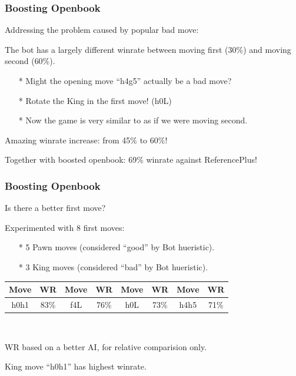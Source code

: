 \documentclass[10pt]{beamer}
\begin{document}
	\begin{frame}
		\frametitle{Boosting Openbook}

		Addressing the problem caused by popular bad move:

		The bot has a largely different winrate between moving first (\textcolor{dred}{30\%}) and moving second (\textcolor{fgreen}{60\%}).

		\begin{itemize}
		\item[*] Might the opening move ``h4g5'' actually be a bad move?
		\item[*] Rotate the King in the first move! (h0L)
		\item[*] Now the game is very similar to as if we were moving second.
		\end{itemize}

		Amazing winrate increase: from \textcolor{dred}{45\%} to \textcolor{fgreen}{60\%}!

		Together with boosted openbook: \textcolor{fgreen}{69\%} winrate against ReferencePlus!
	\end{frame}

	\begin{frame}
		\frametitle{Boosting Openbook}
		
		Is there a better first move?\pause
		
		Experimented with 8 first moves:
		\begin{itemize}
		\item[*] \textcolor{fgreen}{5} Pawn moves (considered ``\textcolor{fgreen}{good}'' by Bot hueristic).
		\item[*] \textcolor{fgreen}{3} King moves (considered ``\textcolor{dred}{bad}'' by Bot hueristic).
		\end{itemize}
		\pause
		\begin{center}
\begin{tabular}{cc|cc|cc|cc}\hline\hline
Move & WR   & Move & WR   & Move & WR   & Move & WR   \\\hline
h0h1 & \textcolor{fgreen}{83\%} & f4L  & 76\% & h0L  & 73\% & h4h5 & 71\% \\\hline\hline
\end{tabular}

\

{\small WR based on a better AI, for relative comparision only.}
		\end{center}
		
		King move ``h0h1'' has highest winrate.
		
	\end{frame}
	
\end{document}
